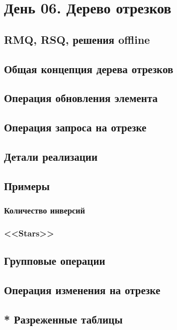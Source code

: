 \documentclass[a4paper,12pt]{article}
\begin{document}
  \section{День 06. Дерево отрезков}

    \subsection{RMQ, RSQ, решения offline}

    \subsection{Общая концепция дерева отрезков}

    \subsection{Операция обновления элемента}

    \subsection{Операция запроса на отрезке}

    \subsection{Детали реализации}

    \subsection{Примеры}
      \subsubsection{Количество инверсий}
      \subsubsection{<<Stars>>}

    \subsection{Групповые операции}

    \subsection{Операция изменения на отрезке}

    \subsection{* Разреженные таблицы}
\end{document}
